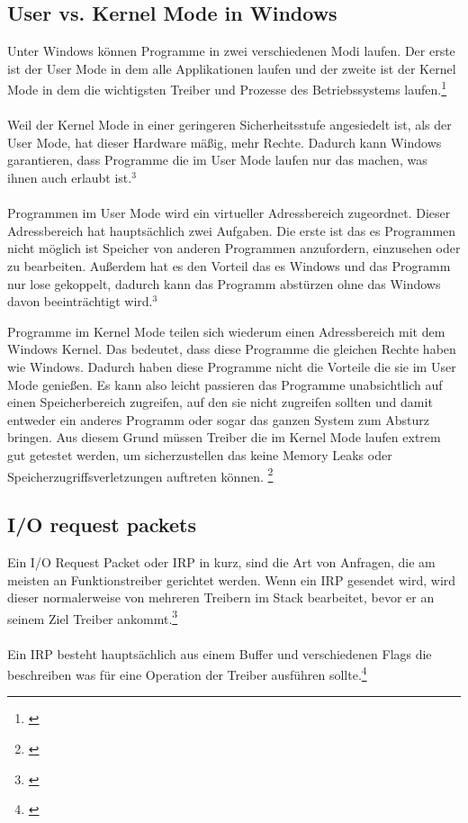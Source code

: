 \subsection{User vs. Kernel Mode in Windows}
Unter Windows können Programme in zwei verschiedenen Modi laufen. Der erste ist der User Mode in dem alle Applikationen laufen und der zweite ist der Kernel Mode in dem die wichtigsten Treiber und Prozesse des Betriebssystems laufen.\footnote[3]{\cite[Vgl.][]{21}}
\\\\
Weil der Kernel Mode in einer geringeren Sicherheitsstufe angesiedelt ist, als der User Mode, hat dieser Hardware mäßig, mehr Rechte. Dadurch kann Windows garantieren, dass Programme die im User Mode laufen nur das machen, was ihnen auch erlaubt ist.$^{3}$
\\\\
Programmen im User Mode wird ein virtueller Adressbereich zugeordnet. Dieser Adressbereich hat hauptsächlich zwei Aufgaben. Die erste ist das es Programmen nicht möglich ist Speicher von anderen Programmen anzufordern, einzusehen oder zu bearbeiten. Außerdem hat es den Vorteil das es Windows und das Programm nur lose gekoppelt, dadurch kann das Programm abstürzen ohne das Windows davon beeinträchtigt wird.$^{3}$

\newpage

Programme im Kernel Mode teilen sich wiederum einen Adressbereich mit dem Windows Kernel. Das bedeutet, dass diese Programme die gleichen Rechte haben wie Windows. Dadurch haben diese Programme nicht die Vorteile die sie im User Mode genießen. Es kann also leicht passieren das Programme unabsichtlich auf einen Speicherbereich zugreifen, auf den sie nicht zugreifen sollten und damit entweder ein anderes Programm oder sogar das ganzen System zum Absturz bringen. Aus diesem Grund müssen Treiber die im Kernel Mode laufen extrem gut getestet werden, um sicherzustellen das keine Memory Leaks oder Speicherzugriffsverletzungen auftreten können. \footnote[1]{\cite[Vgl.][]{21}}

\subsection{I/O request packets}
Ein I/O Request Packet oder IRP in kurz, sind die Art von Anfragen, die am meisten an Funktionstreiber gerichtet werden. Wenn ein IRP gesendet wird, wird dieser normalerweise von mehreren Treibern im Stack bearbeitet, bevor er an seinem Ziel Treiber ankommt.\footnote[2]{\cite[Vgl.][]{23}}
\\\\
Ein IRP besteht hauptsächlich aus einem Buffer und verschiedenen Flags die beschreiben was für eine Operation der Treiber ausführen sollte.\footnote[3]{\cite[Vgl.][]{22}}

